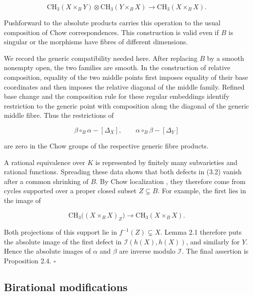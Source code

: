 \documentclass[11pt,a4paper]{article}
\begin{document}
\begin{equation*}
\mathrm{CH}_3(X\times_B Y)\otimes
\mathrm{CH}_3(Y\times_B X)
\longrightarrow\mathrm{CH}_3(X\times_B X).
\end{equation*}

Pushforward to the absolute products carries this operation to the usual composition of Chow correspondences. This construction is valid even if $B$ is singular or the morphisms have fibres of different dimensions.

We record the generic compatibility needed here. After replacing $B$ by a smooth nonempty open, the two families are smooth. In the construction of relative composition, equality of the two middle points first imposes equality of their base coordinates and then imposes the relative diagonal of the middle family. Refined base change and the composition rule for these regular embeddings identify restriction to the generic point with composition along the diagonal of the generic middle fibre. Thus the restrictions of

\begin{equation*}
\beta\circ_B\alpha-[\Delta_X],
\qquad
\alpha\circ_B\beta-[\Delta_Y]
\tag{3.2}
\end{equation*}

are zero in the Chow groups of the respective generic fibre products.

A rational equivalence over $K$ is represented by finitely many subvarieties and rational functions. Spreading these data shows that both defects in (3.2) vanish after a common shrinking of $B$. By Chow localization \cite[Proposition 1.8]{Ful98}, they therefore come from cycles supported over a proper closed subset $Z\subsetneq B$. For example, the first lies in the image of

\begin{equation*}
\mathrm{CH}_3\bigl((X\times_B X)_Z\bigr)
\longrightarrow\mathrm{CH}_3(X\times_B X).
\end{equation*}

Both projections of this support lie in $f^{-1}(Z)\subsetneq X$. Lemma 2.1 therefore puts the absolute image of the first defect in $\mathcal I(h(X),h(X))$, and similarly for $Y$. Hence the absolute images of $\alpha$ and $\beta$ are inverse modulo $\mathcal I$. The final assertion is Proposition 2.4. $\square$

\subsection{Birational modifications}
\end{document}
